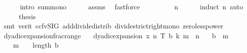 \begin{isabellebody}
\ \ \ \ \isamarkupfalse%
\ {\isacharparenleft}{\kern0pt}intro\ sum{\isacharunderscore}{\kern0pt}mono{\isacharparenright}{\kern0pt}\isanewline
\ \ \ \ \isamarkupfalse%
\ assms\ \isamarkupfalse%
\ fastforce\isanewline
\ \ \isamarkupfalse%
\ \isamarkupfalse%
\ {\isachardoublequoteopen}{\isachardot}{\kern0pt}{\isachardot}{\kern0pt}{\isachardot}{\kern0pt}\ {\isacharequal}{\kern0pt}\ {}\ {\isacharminus}{\kern0pt}\ {}{\isacharslash}{\kern0pt}{}{\isacharcircum}{\kern0pt}n{\isachardoublequoteclose}\isanewline
\ \ \ \ \isamarkupfalse%
\ {\isacharparenleft}{\kern0pt}induct\ n{\isacharcomma}{\kern0pt}\ auto{\isacharparenright}{\kern0pt}\isanewline
\ \ \isamarkupfalse%
\ \isamarkupfalse%
\ {\isacharquery}{\kern0pt}thesis\isanewline
\ \ \ \ \isamarkupfalse%
\ {\isacharparenleft}{\kern0pt}smt\ {\isacharparenleft}{\kern0pt}verit{\isacharcomma}{\kern0pt}\ ccfv{\isacharunderscore}{\kern0pt}SIG{\isacharparenright}{\kern0pt}\ add{\isacharunderscore}{\kern0pt}divide{\isacharunderscore}{\kern0pt}distrib\ divide{\isacharunderscore}{\kern0pt}strict{\isacharunderscore}{\kern0pt}right{\isacharunderscore}{\kern0pt}mono\ zero{\isacharunderscore}{\kern0pt}less{\isacharunderscore}{\kern0pt}power{\isacharparenright}{\kern0pt}\isanewline
{}\isamarkupfalse%
%
\endisatagproof
{\isafoldproof}%
%
\isadelimproof
\isanewline
%
\endisadelimproof
\isanewline
{}\isamarkupfalse%
\ dyadic{\isacharunderscore}{\kern0pt}expansion{\isacharunderscore}{\kern0pt}frac{\isacharunderscore}{\kern0pt}range{\isacharcolon}{\kern0pt}\isanewline
\ \ \ {\isachardoublequoteopen}dyadic{\isacharunderscore}{\kern0pt}expansion\ x\ n\ T\ b\ k{\isachardoublequoteclose}\ {\isachardoublequoteopen}m\ {\isasymin}\ {\isacharbraceleft}{\kern0pt}{}{\isachardot}{\kern0pt}{\isachardot}{\kern0pt}n{\isacharbraceright}{\kern0pt}{\isachardoublequoteclose}\isanewline
\ \ \ {\isachardoublequoteopen}b\ {\isacharbang}{\kern0pt}\ {\isacharparenleft}{\kern0pt}m{\isacharminus}{\kern0pt}{}{\isacharparenright}{\kern0pt}\ {\isasymin}\ {\isacharbraceleft}{\kern0pt}{}{\isacharcomma}{\kern0pt}{}{\isacharbraceright}{\kern0pt}{\isachardoublequoteclose}\isanewline
%
\isadelimproof
%
\endisadelimproof
%
\isatagproof
{}\isamarkupfalse%
\ {\isacharminus}{\kern0pt}\isanewline
\ \ \isamarkupfalse%
\ {\isachardoublequoteopen}m\ {\isacharminus}{\kern0pt}\ {}\ {\isacharless}{\kern0pt}\ length\ b{\isachardoublequoteclose}\isanewline

\end{isabellebody}
